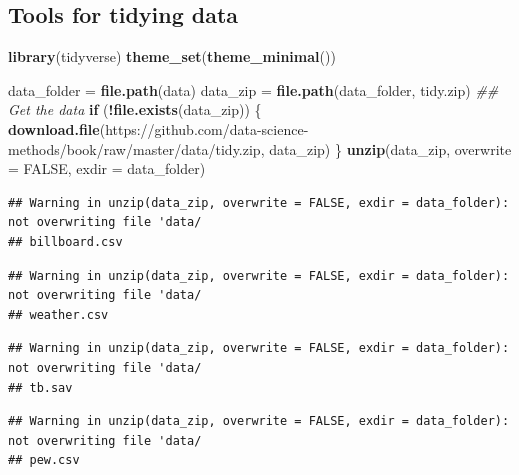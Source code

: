 \documentclass[
]{article}
\newenvironment{Shaded}{\begin{snugshade}}{\end{snugshade}}
\newcommand{\CommentTok}[1]{\textcolor[rgb]{0.56,0.35,0.01}{\textit{#1}}}
\newcommand{\ControlFlowTok}[1]{\textcolor[rgb]{0.13,0.29,0.53}{\textbf{#1}}}
\newcommand{\DataTypeTok}[1]{\textcolor[rgb]{0.13,0.29,0.53}{#1}}
\newcommand{\KeywordTok}[1]{\textcolor[rgb]{0.13,0.29,0.53}{\textbf{#1}}}
\newcommand{\NormalTok}[1]{#1}
\newcommand{\OperatorTok}[1]{\textcolor[rgb]{0.81,0.36,0.00}{\textbf{#1}}}
\newcommand{\OtherTok}[1]{\textcolor[rgb]{0.56,0.35,0.01}{#1}}
\newcommand{\StringTok}[1]{\textcolor[rgb]{0.31,0.60,0.02}{#1}}
\begin{document}
\hypertarget{tools-for-tidying-data}{%
\subsection{Tools for tidying data}\label{tools-for-tidying-data}}

\begin{Shaded}
\begin{Highlighting}[]
\KeywordTok{library}\NormalTok{(tidyverse)}
\KeywordTok{theme\_set}\NormalTok{(}\KeywordTok{theme\_minimal}\NormalTok{())}

\NormalTok{data\_folder =}\StringTok{ }\KeywordTok{file.path}\NormalTok{(}\StringTok{\textquotesingle{}data\textquotesingle{}}\NormalTok{)}
\NormalTok{data\_zip =}\StringTok{ }\KeywordTok{file.path}\NormalTok{(data\_folder, }\StringTok{\textquotesingle{}tidy.zip\textquotesingle{}}\NormalTok{)}
\CommentTok{\#\# Get the data}
\ControlFlowTok{if}\NormalTok{ (}\OperatorTok{!}\KeywordTok{file.exists}\NormalTok{(data\_zip)) \{}
    \KeywordTok{download.file}\NormalTok{(}\StringTok{\textquotesingle{}https://github.com/data{-}science{-}methods/book/raw/master/data/tidy.zip\textquotesingle{}}\NormalTok{, }
\NormalTok{                  data\_zip)}
\NormalTok{\}}
\KeywordTok{unzip}\NormalTok{(data\_zip, }\DataTypeTok{overwrite =} \OtherTok{FALSE}\NormalTok{, }\DataTypeTok{exdir =}\NormalTok{ data\_folder)}
\end{Highlighting}
\end{Shaded}

\begin{verbatim}
## Warning in unzip(data_zip, overwrite = FALSE, exdir = data_folder): not overwriting file 'data/
## billboard.csv
\end{verbatim}

\begin{verbatim}
## Warning in unzip(data_zip, overwrite = FALSE, exdir = data_folder): not overwriting file 'data/
## weather.csv
\end{verbatim}

\begin{verbatim}
## Warning in unzip(data_zip, overwrite = FALSE, exdir = data_folder): not overwriting file 'data/
## tb.sav
\end{verbatim}

\begin{verbatim}
## Warning in unzip(data_zip, overwrite = FALSE, exdir = data_folder): not overwriting file 'data/
## pew.csv
\end{verbatim}
\end{document}
